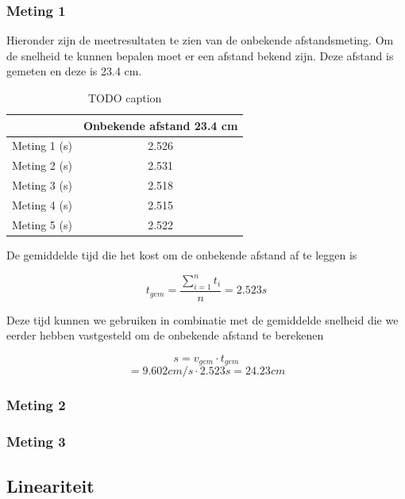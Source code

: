 \documentclass{report}
\begin{document}
\subsubsection*{Meting 1}
Hieronder zijn de meetresultaten te zien van de onbekende afstandsmeting. Om de snelheid te kunnen bepalen moet er een afstand bekend zijn. Deze afstand is gemeten en deze is 23.4 cm.
\begin{table}
\begin{center}
\begin{tabular}{| l| c|}
\hline
    & Onbekende afstand 23.4 cm\\
\hline
   Meting 1 (s) & 2.526 \\
\hline
   Meting 2 (s) & 2.531 \\
\hline
   Meting 3 (s) & 2.518 \\
\hline
   Meting 4 (s) & 2.515 \\
\hline
   Meting 5 (s) & 2.522 \\
\hline
 \end{tabular}
\caption{TODO caption}
\end{center}
\end{table}

De gemiddelde tijd die het kost om de onbekende afstand af te leggen is

$$ t_{gem}=\frac{\sum_{i=1}^{n}t_i}{n} = 2.523 s$$ 

Deze tijd kunnen we gebruiken in combinatie met de gemiddelde snelheid die we eerder hebben vastgesteld om de onbekende afstand te berekenen

$$ s = v_{gem} \cdot t_{gem}$$
$$ = 9.602 cm/s \cdot 2.523 s = 24.23 cm$$

\subsubsection*{Meting 2}

\subsubsection*{Meting 3}

\subsection*{Lineariteit}
\end{document}

